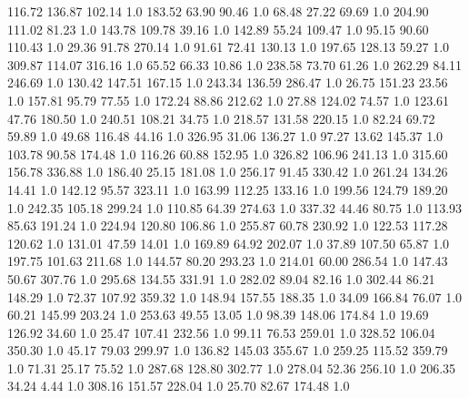     116.72    136.87    102.14  1.0
    183.52     63.90     90.46  1.0
     68.48     27.22     69.69  1.0
    204.90    111.02     81.23  1.0
    143.78    109.78     39.16  1.0
    142.89     55.24    109.47  1.0
     95.15     90.60    110.43  1.0
     29.36     91.78    270.14  1.0
     91.61     72.41    130.13  1.0
    197.65    128.13     59.27  1.0
    309.87    114.07    316.16  1.0
     65.52     66.33     10.86  1.0
    238.58     73.70     61.26  1.0
    262.29     84.11    246.69  1.0
    130.42    147.51    167.15  1.0
    243.34    136.59    286.47  1.0
     26.75    151.23     23.56  1.0
    157.81     95.79     77.55  1.0
    172.24     88.86    212.62  1.0
     27.88    124.02     74.57  1.0
    123.61     47.76    180.50  1.0
    240.51    108.21     34.75  1.0
    218.57    131.58    220.15  1.0
     82.24     69.72     59.89  1.0
     49.68    116.48     44.16  1.0
    326.95     31.06    136.27  1.0
     97.27     13.62    145.37  1.0
    103.78     90.58    174.48  1.0
    116.26     60.88    152.95  1.0
    326.82    106.96    241.13  1.0
    315.60    156.78    336.88  1.0
    186.40     25.15    181.08  1.0
    256.17     91.45    330.42  1.0
    261.24    134.26     14.41  1.0
    142.12     95.57    323.11  1.0
    163.99    112.25    133.16  1.0
    199.56    124.79    189.20  1.0
    242.35    105.18    299.24  1.0
    110.85     64.39    274.63  1.0
    337.32     44.46     80.75  1.0
    113.93     85.63    191.24  1.0
    224.94    120.80    106.86  1.0
    255.87     60.78    230.92  1.0
    122.53    117.28    120.62  1.0
    131.01     47.59     14.01  1.0
    169.89     64.92    202.07  1.0
     37.89    107.50     65.87  1.0
    197.75    101.63    211.68  1.0
    144.57     80.20    293.23  1.0
    214.01     60.00    286.54  1.0
    147.43     50.67    307.76  1.0
    295.68    134.55    331.91  1.0
    282.02     89.04     82.16  1.0
    302.44     86.21    148.29  1.0
     72.37    107.92    359.32  1.0
    148.94    157.55    188.35  1.0
     34.09    166.84     76.07  1.0
     60.21    145.99    203.24  1.0
    253.63     49.55     13.05  1.0
     98.39    148.06    174.84  1.0
     19.69    126.92     34.60  1.0
     25.47    107.41    232.56  1.0
     99.11     76.53    259.01  1.0
    328.52    106.04    350.30  1.0
     45.17     79.03    299.97  1.0
    136.82    145.03    355.67  1.0
    259.25    115.52    359.79  1.0
     71.31     25.17     75.52  1.0
    287.68    128.80    302.77  1.0
    278.04     52.36    256.10  1.0
    206.35     34.24      4.44  1.0
    308.16    151.57    228.04  1.0
     25.70     82.67    174.48  1.0

